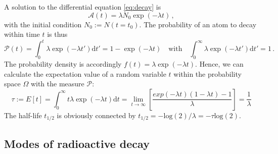 A solution to the differential equation \eqref{eq:decay} is
\begin{equation}
    \mathcal{A}(t) = \lambda N_0 \exp(-\lambda t) \, ,
\end{equation}
with the initial condition $N_0 := N(t=t_0)$. 
The probability of an atom to decay within time $t$ is thus
\begin{equation}
    \mathcal{P}(t) = \int_{0}^{t}\lambda \exp(-\lambda t')\mathrm{d}t' = 1 -  \exp(-\lambda t)  \quad
    \textrm{with} \quad \int_{0}^{\infty}\lambda \exp(-\lambda t')\mathrm{d}t' = 1 \, .
\end{equation}
The probability density is accordingly $f(t) = \lambda \exp(-\lambda t)$. 
Hence, we can calculate the expectation value of a random variable $t$ within the probability space
$\Omega$ with the measure  $\mathcal{P}$:
\begin{equation}
    \tau := E[t] = \int_{0}^{\infty} t \lambda \exp(-\lambda t) \mathrm{d}t 
    =\lim_{t \rightarrow \infty}\left[ \frac{exp(-\lambda t) (1-\lambda t) - 1 }{\lambda} \right] 
= \frac{1}{\lambda}
\end{equation}
The half-life $t_{1/2}$ is obviously connected by $t_{1/2}= -\mathrm{log}(2)/ \lambda = - \tau \mathrm{log}(2)$.

\subsection{Modes of radioactive decay}
